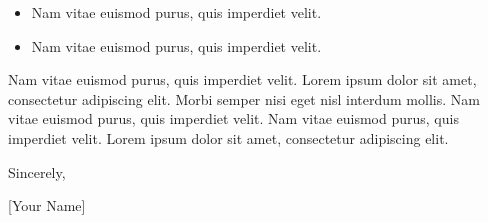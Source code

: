 \documentclass[a4paper,11pt]{article} %
\begin{document}
\begin{itemize}
    \item Nam vitae euismod purus, quis imperdiet velit.
    \item Nam vitae euismod purus, quis imperdiet velit.
\end{itemize}

Nam vitae euismod purus, quis imperdiet velit. Lorem ipsum dolor sit amet, consectetur adipiscing elit. Morbi semper nisi eget nisl interdum mollis. Nam vitae euismod purus, quis imperdiet velit. Nam vitae euismod purus, quis imperdiet velit. Lorem ipsum dolor sit amet, consectetur adipiscing elit.

\vspace{0.25in}

Sincerely,

[Your Name]

\vfill
\end{document}
